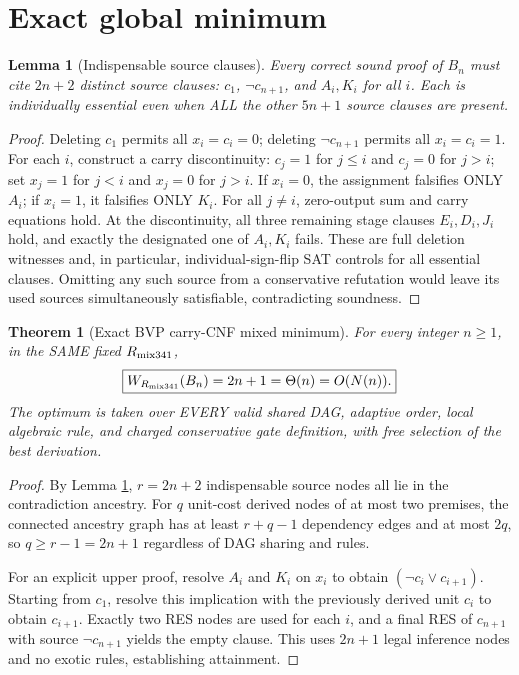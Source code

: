 \documentclass[11pt]{article}
\newtheorem{theorem}{Theorem}
\newtheorem{lemma}{Lemma}
\begin{document}
\section*{Exact global minimum}
\begin{lemma}[Indispensable source clauses]\label{lem:essential}
Every correct sound proof of $B_n$ must cite $2n+2$ distinct source clauses:
$c_1$, $\neg c_{n+1}$, and $A_i,K_i$ for all $i$. Each is individually essential even when ALL the other $5n+1$ source clauses are present.
\end{lemma}
\begin{proof}
Deleting $c_1$ permits all $x_i=c_i=0$; deleting $\neg c_{n+1}$ permits all $x_i=c_i=1$. For each $i$, construct a carry discontinuity:
$c_j=1$ for $j\le i$ and $c_j=0$ for $j>i$; set $x_j=1$ for $j<i$ and $x_j=0$ for $j>i$. If $x_i=0$, the assignment falsifies ONLY $A_i$; if $x_i=1$, it falsifies ONLY $K_i$. For all $j\ne i$, zero-output sum and carry equations hold. At the discontinuity, all three remaining stage clauses $E_i,D_i,J_i$ hold, and exactly the designated one of $A_i,K_i$ fails. These are full deletion witnesses and, in particular, individual-sign-flip SAT controls for all essential clauses. Omitting any such source from a conservative refutation would leave its used sources simultaneously satisfiable, contradicting soundness.
\end{proof}
\begin{theorem}[Exact BVP carry-CNF mixed minimum]\label{thm:exact}
For every integer $n\ge1$, in the SAME fixed $R_{\rm mix341}$,
\[
\boxed{W_{R_{\rm mix341}}(B_n)=2n+1=\Theta(n)=O(N(n)).}
\]
The optimum is taken over EVERY valid shared DAG, adaptive order, local algebraic rule, and charged conservative gate definition, with free selection of the best derivation.
\end{theorem}
\begin{proof}
By Lemma \ref{lem:essential}, $r=2n+2$ indispensable source nodes all lie in the contradiction ancestry. For $q$ unit-cost derived nodes of at most two premises, the connected ancestry graph has at least $r+q-1$ dependency edges and at most $2q$, so $q\ge r-1=2n+1$ regardless of DAG sharing and rules.

For an explicit upper proof, resolve $A_i$ and $K_i$ on $x_i$ to obtain $(\neg c_i\lor c_{i+1})$. Starting from $c_1$, resolve this implication with the previously derived unit $c_i$ to obtain $c_{i+1}$. Exactly two RES nodes are used for each $i$, and a final RES of $c_{n+1}$ with source $\neg c_{n+1}$ yields the empty clause. This uses $2n+1$ legal inference nodes and no exotic rules, establishing attainment.
\end{proof}
\end{document}
